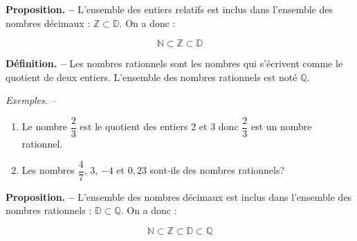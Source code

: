 \documentclass[handout]{beamer}
\begin{document}
\begin{frame}
  \textbf{Proposition. --} L'ensemble des entiers relatifs est inclus dans l'ensemble des nombres décimaux : $\mathbb{Z}\subset\mathbb{D}$.\pause{} On a donc :

  \[\mathbb{N}\subset\mathbb{Z}\subset\mathbb{D}\]
\end{frame}

\begin{frame}
  \textbf{Définition. --} Les nombres rationnels sont\pause{} les nombres qui s'écrivent comme le quotient de deux entiers.\pause{} L'ensemble des nombres rationnels est noté $\mathbb{Q}$.\pause{}

 \bigskip

 \textit{Exemples. --} 
 \begin{enumerate}
   \item Le nombre $\dfrac{2}{3}$ est le quotient des entiers $2$ et $3$ donc $\dfrac{2}{3}$ est un nombre rationnel.
   \item Les nombres $\dfrac{4}{7}$, $3$, $-4$ et $0,23$ sont-ils des nombres rationnels?
 \end{enumerate}
\end{frame}

\begin{frame}
  \textbf{Proposition. --} L'ensemble des nombres décimaux est inclus dans l'ensemble des nombres rationnels :\pause{} $\mathbb{D}\subset\mathbb{Q}$.\pause{} On a donc :

  \[\mathbb{N}\subset\mathbb{Z}\subset\mathbb{D}\subset\mathbb{Q}\]
\end{frame}
\end{document}
